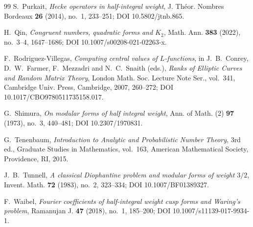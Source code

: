 \documentclass[11pt]{amsart}
\theoremstyle{remark}
\begin{document}
\begin{thebibliography}{99}
S.~Purkait,
\emph{Hecke operators in half-integral weight},
J. Th\'eor. Nombres Bordeaux \textbf{26} (2014), no.~1, 233--251; DOI 10.5802/jtnb.865.

H.~Qin,
\emph{Congruent numbers, quadratic forms and $K_2$},
Math. Ann. \textbf{383} (2022), no.~3--4, 1647--1686; DOI 10.1007/s00208-021-02263-x.


F.~Rodriguez-Villegas,
\emph{Computing central values of $L$-functions},
in J.~B.~Conrey, D.~W.~Farmer, F.~Mezzadri and N.~C.~Snaith (eds.),
\emph{Ranks of Elliptic Curves and Random Matrix Theory},
London Math. Soc. Lecture Note Ser., vol.~341,
Cambridge Univ. Press, Cambridge, 2007, 260--272;
DOI 10.1017/CBO9780511735158.017.


G.~Shimura,
\emph{On modular forms of half integral weight},
Ann. of Math. (2) \textbf{97} (1973), no.~3, 440--481; DOI 10.2307/1970831.

G.~Tenenbaum,
\emph{Introduction to Analytic and Probabilistic Number Theory}, 3rd ed.,
Graduate Studies in Mathematics, vol.~163,
American Mathematical Society, Providence, RI, 2015.

J.~B.~Tunnell,
\emph{A classical Diophantine problem and modular forms of weight $3/2$},
Invent. Math. \textbf{72} (1983), no.~2, 323--334;
DOI 10.1007/BF01389327.

F.~Waibel,
\emph{Fourier coefficients of half-integral weight cusp forms and Waring's problem},
Ramanujan J. \textbf{47} (2018), no.~1, 185--200; DOI 10.1007/s11139-017-9934-1.


\end{thebibliography}
\end{document}
